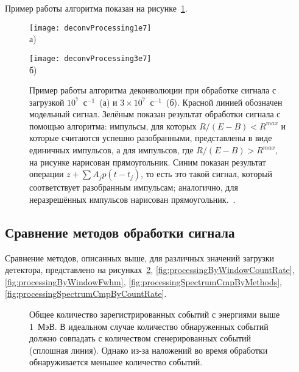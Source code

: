 Пример работы алгоритма показан на рисунке~\ref{fig:DeconvProcessing}.

\begin{figure}[ht]
    \begin{minipage}[b][][b]{0.95\linewidth}\centering
        \texttt{[image: deconvProcessing1e7]} \\ а)
    \end{minipage}
    \vfill
    \begin{minipage}[b][][b]{0.95\linewidth}\centering
        \texttt{[image: deconvProcessing3e7]} \\ б)
    \end{minipage}
    \vspace{5mm}
    \caption{ Пример работы алгоритма деконволюции при обработке сигнала с загрузкой $10^7$~с${}^{-1}$~(а) и $3 \times 10^7$~с${}^{-1}$~(б). Красной линией обозначен модельный сигнал. Зелёным показан результат обработки сигнала с помощью алгоритма: импульсы, для которых $R/(E-B)<R^{max}$ и которые считаются успешно разобранными, представлены в виде единичных импульсов, а для импульсов, где $R/(E-B)>R^{max}$, на рисунке нарисован прямоугольник. Синим показан результат операции $z + \sum A_j p(t - t_j)$, то есть это такой сигнал, который соответствует разобранным импульсам; аналогично, для неразрешённых импульсов нарисован прямоугольник.~\cite{Khilkevitch2020}. }
    \label{fig:DeconvProcessing}
\end{figure}


\subsection{Сравнение методов обработки сигнала}

Сравнение методов, описанных выше, для различных значений загрузки детектора, представлено на рисунках~\ref{fig:processingTotalCountRate},  \ref{fig:processingByWindowCountRate}, \ref{fig:processingByWindowFwhm}, \ref{fig:processingSpectrumCmpByMethods}, \ref{fig:processingSpectrumCmpByCountRate}. 

\begin{figure}[ht!]
  \caption{Общее количество зарегистрированных событий с энергиями выше 1~МэВ. В идеальном случае количество обнаруженных событий должно совпадать с количеством сгенерированных событий (сплошная линия). Однако из-за наложений во время обработки обнаруживается меньшее количество событий.~\cite{Khilkevitch2020} }
  \label{fig:processingTotalCountRate}
\end{figure}

